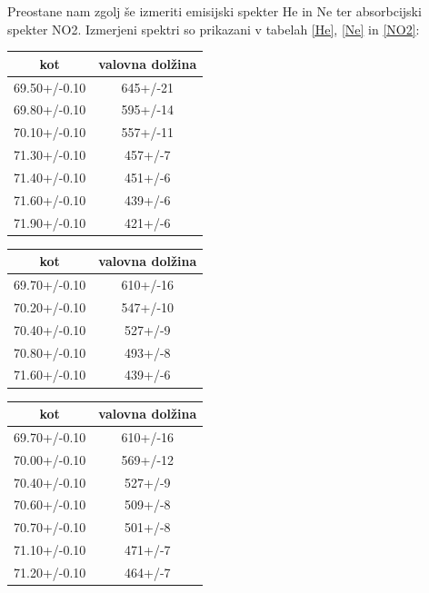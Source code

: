 \documentclass[12pt]{article}
\begin{document}
\noindent Preostane nam zgolj še izmeriti emisijski spekter He in Ne ter absorbcijski spekter NO2. Izmerjeni spektri so prikazani v tabelah \ref{He}, \ref{Ne} in \ref{NO2}:

\begin{center}
\begin{minipage}{0.3\textwidth}
\centering
\begin{tabular}{c|c}
    kot & valovna dolžina \\\hline
    69.50+/-0.10 & 645+/-21 \\
    69.80+/-0.10 & 595+/-14 \\
    70.10+/-0.10 & 557+/-11 \\
    71.30+/-0.10 & 457+/-7 \\
    71.40+/-0.10 & 451+/-6 \\
    71.60+/-0.10 & 439+/-6 \\
    71.90+/-0.10 & 421+/-6 \\
\end{tabular}
\label{He}
\end{minipage}%
\hfill
\begin{minipage}{0.3\textwidth}
\centering
\begin{tabular}{c|c}
    kot & valovna dolžina \\\hline
    69.70+/-0.10 & 610+/-16 \\
    70.20+/-0.10 & 547+/-10 \\
    70.40+/-0.10 & 527+/-9 \\
    70.80+/-0.10 & 493+/-8 \\
    71.60+/-0.10 & 439+/-6 \\
\end{tabular}
\label{Ne}
\end{minipage}%
\hfill
\begin{minipage}{0.3\textwidth}
\centering
\begin{tabular}{c|c}
    kot & valovna dolžina \\\hline
    69.70+/-0.10 & 610+/-16 \\
    70.00+/-0.10 & 569+/-12 \\
    70.40+/-0.10 & 527+/-9 \\
    70.60+/-0.10 & 509+/-8 \\
    70.70+/-0.10 & 501+/-8 \\
    71.10+/-0.10 & 471+/-7 \\
    71.20+/-0.10 & 464+/-7 \\
\end{tabular}
\label{NO2}
\end{minipage}
\end{center}
\end{document}

